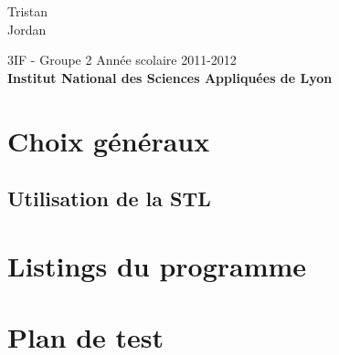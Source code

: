 \documentclass[a4paper,french,10pt,twoside]{article}
\begin{document}
\vspace*{5cm}

\setlength\fboxrule{2pt}

\vspace{1cm}

\begin{center}
  \Large \textbf{}\\
\end{center}

\begin{center}
	\vspace*{3cm}
	\LARGE {}\\ \vspace{10pt}\large \color{black} Tristan  \\ Jordan  \\
				   \vspace*{1.5cm}

				   \vspace*{1cm}

				   \Large 3IF - Groupe 2 \hfill Ann\'ee scolaire 2011-2012\\
				   \vspace*{1cm}
				   \textbf{\Large Institut National des Sciences Appliqu\'{e}es de Lyon} \pagebreak
\end{center}

\section{Choix g\'en\'eraux}

\subsection{Utilisation de la STL}

\newpage

\section{Listings du programme}

\newpage

\newpage

\newpage

\newpage

\newpage

\newpage

\newpage

\newpage


\newpage


\newpage
\section{Plan de test}
\end{document}
